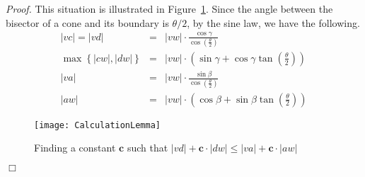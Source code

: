 \documentclass[12pt]{article}
\newenvironment{proof}{\emph{Proof.}}{\hfill $\Box$\\}
\newcommand{\const}{\ensuremath{\boldsymbol{c}}\xspace}
\begin{document}
\begin{proof}
  This situation is illustrated in Figure~\ref{fig:CalculationLemma}. Since the angle between the bisector of a cone and its boundary is $\theta/2$, by the sine law, we have the following. 
  \begin{eqnarray*}
    |v c| = |v d| &=& |v w| \cdot \frac{\cos \gamma}{\cos \left( \frac{\theta}{2} \right) } \\ 
    \max \left\{|c w|, |d w| \right\} &=& |v w| \cdot \left( \sin \gamma + \cos \gamma \tan \left( \frac{\theta}{2} \right) \right) \\ 
    |v a| &=& |v w| \cdot \frac{\sin \beta}{\cos \left( \frac{\theta}{2} \right) } \\ 
    |a w| &=& |v w| \cdot \left( \cos \beta + \sin \beta \tan \left( \frac{\theta}{2} \right) \right)
  \end{eqnarray*}

  \begin{figure}[ht]
    \begin{center}
      \texttt{[image: CalculationLemma]}
    \end{center}
    \caption{Finding a constant \const such that $|v d| + \const \cdot |d w| \leq |v a| + \const \cdot |a w|$}
    \label{fig:CalculationLemma}
  \end{figure}


\end{proof}
\end{document}
